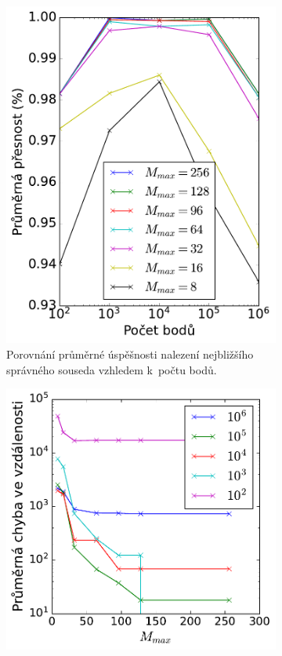 \begin{figure}
\begin{subfigure}[t]{0.49\columnwidth}
    \includegraphics[scale=0.6]{obrazky-figures/benchmark/accuracy/benchmark_accuracy_by_points.pdf}
    \caption{Porovnání průměrné úspěšnosti nalezení nejbližšího správného souseda vzhledem k~počtu bodů.}
    \label{fig:accurucybench_acc_points}
\end{subfigure}
\hfill
\begin{subfigure}[t]{0.49\columnwidth}
    \centering  
    \includegraphics[scale=0.6]{obrazky-figures/benchmark/accuracy/benchmark_avgerr_by_mmax.pdf}

\end{subfigure}
\end{figure}
